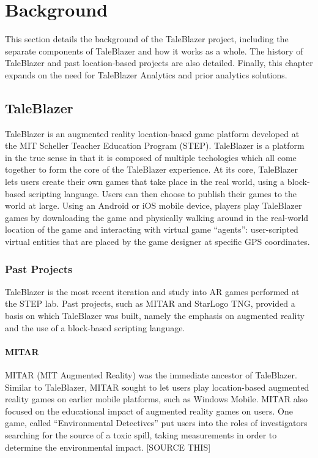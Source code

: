 \chapter{Background}

This section details the background of the TaleBlazer project, including the separate components of TaleBlazer and how it works as a whole. The history of TaleBlazer and past location-based projects are also detailed. Finally, this chapter expands on the need for TaleBlazer Analytics and prior analytics solutions. 

\section{TaleBlazer}

TaleBlazer is an augmented reality location-based game platform developed at the MIT Scheller Teacher Education Program (STEP). TaleBlazer is a platform in the true sense in that it is composed of multiple techologies which all come together to form the core of the TaleBlazer experience. At its core, TaleBlazer lets users create their own games that take place in the real world, using a block-based scripting language. Users can then choose to publish their games to the world at large. Using an Android or iOS mobile device, players play TaleBlazer games by downloading the game and physically walking around in the real-world location of the game and interacting with virtual game ``agents'': user-scripted virtual entities that are placed by the game designer at specific GPS coordinates.

\subsection{Past Projects}

TaleBlazer is the most recent iteration and study into AR games performed at the STEP lab. Past projects, such as MITAR and StarLogo TNG, provided a basis on which TaleBlazer was built, namely the emphasis on augmented reality and the use of a block-based scripting language.

\subsubsection{MITAR}

MITAR (MIT Augmented Reality) was the immediate ancestor of TaleBlazer. Similar to TaleBlazer, MITAR sought to let users play location-based augmented reality games on earlier mobile platforms, such as Windows Mobile. MITAR also focused on the educational impact of augmented reality games on users. One game, called ``Environmental Detectives'' put users into the roles of investigators searching for the source of a toxic spill, taking measurements in order to determine the environmental impact. [SOURCE THIS]

